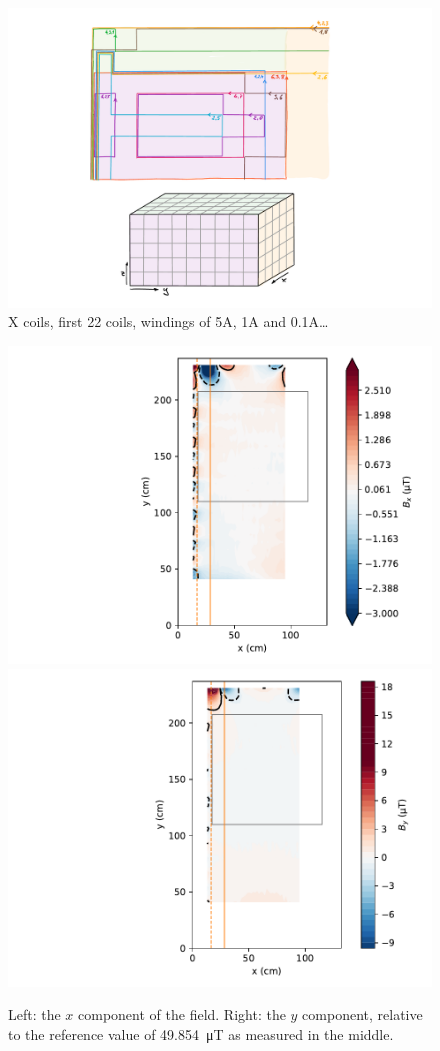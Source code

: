 \begin{figure}
  \centering
  \includegraphics[width=\linewidth]{gfx/prototype/open_design_Xcoil_coils.pdf}
  \caption{X coils, first 22 coils, windings of 5A, 1A and 0.1A\ldots}
  \label{fig:prototype_open_design_Xcoil_coils}
\end{figure}

\begin{figure}
  \centering
  \includegraphics[width=0.45\linewidth,trim={5cm 0 0 0},clip]{gfx/prototype/open_planar_map_Y_Bx.pdf}\quad
  \includegraphics[width=0.45\linewidth,trim={5cm 0 0 0},clip]{gfx/prototype/open_planar_map_Y_By.pdf}
  \caption{Left: the $x$ component of the field. Right: the $y$ component, relative to the reference value of \SI{49.854}{\micro\tesla} as measured in the middle.}
  \label{fig:prototype_open_design_Ycoil_maps}
\end{figure}

